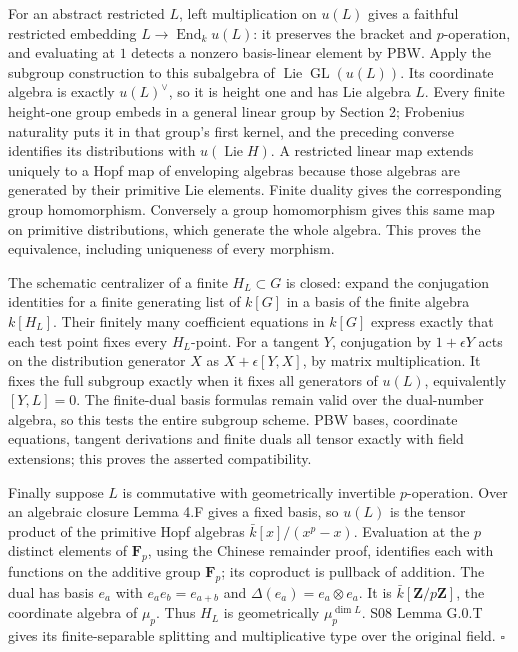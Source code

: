 \documentclass[11pt,a4paper,openany]{report}
\begin{document}
For an abstract restricted \(L\), left multiplication on \(u(L)\) gives a faithful restricted embedding \(L\to\operatorname{End}_k u(L)\): it preserves the bracket and \(p\)-operation, and evaluating at \(1\) detects a nonzero basis-linear element by PBW. Apply the subgroup construction to this subalgebra of \(\operatorname{Lie}\operatorname{GL}(u(L))\). Its coordinate algebra is exactly \(u(L)^\vee\), so it is height one and has Lie algebra \(L\). Every finite height-one group embeds in a general linear group by Section 2; Frobenius naturality puts it in that group's first kernel, and the preceding converse identifies its distributions with \(u(\operatorname{Lie}H)\). A restricted linear map extends uniquely to a Hopf map of enveloping algebras because those algebras are generated by their primitive Lie elements. Finite duality gives the corresponding group homomorphism. Conversely a group homomorphism gives this same map on primitive distributions, which generate the whole algebra. This proves the equivalence, including uniqueness of every morphism.

The schematic centralizer of a finite \(H_L\subset G\) is closed: expand the conjugation identities for a finite generating list of \(k[G]\) in a basis of the finite algebra \(k[H_L]\). Their finitely many coefficient equations in \(k[G]\) express exactly that each test point fixes every \(H_L\)-point. For a tangent \(Y\), conjugation by \(1+\epsilon Y\) acts on the distribution generator \(X\) as \(X+\epsilon[Y,X]\), by matrix multiplication. It fixes the full subgroup exactly when it fixes all generators of \(u(L)\), equivalently \([Y,L]=0\). The finite-dual basis formulas remain valid over the dual-number algebra, so this tests the entire subgroup scheme. PBW bases, coordinate equations, tangent derivations and finite duals all tensor exactly with field extensions; this proves the asserted compatibility.

Finally suppose \(L\) is commutative with geometrically invertible \(p\)-operation. Over an algebraic closure Lemma 4.F gives a fixed basis, so \(u(L)\) is the tensor product of the primitive Hopf algebras \(\bar k[x]/(x^p-x)\). Evaluation at the \(p\) distinct elements of \(\mathbf F_p\), using the Chinese remainder proof, identifies each with functions on the additive group \(\mathbf F_p\); its coproduct is pullback of addition. The dual has basis \(e_a\) with \(e_ae_b=e_{a+b}\) and \(\Delta(e_a)=e_a\otimes e_a\). It is \(\bar k[\mathbf Z/p\mathbf Z]\), the coordinate algebra of \(\mu_p\). Thus \(H_L\) is geometrically \(\mu_p^{\dim L}\). S08 Lemma G.0.T gives its finite-separable splitting and multiplicative type over the original field. \(\square\)
\end{document}
